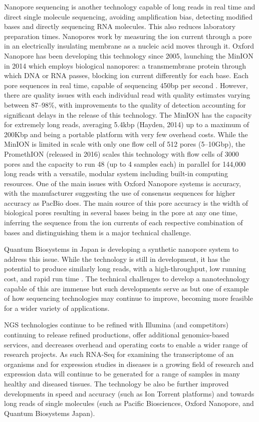 Nanopore sequencing is another technology capable of long reads in real time and direct single molecule sequencing, avoiding amplification bias, detecting modified bases and directly sequencing \gls{RNA} molecules. This also reduces laboratory preparation times. Nanopores work by measuring the ion current through a pore in an electrically insulating membrane as a nucleic acid moves through it. Oxford Nanopore has been developing this technology since 2005, launching the MinION in 2014 which employs biological nanopores: a transmembrane protein through which DNA or \gls{RNA} passes, blocking ion current differently for each base. Each pore sequences in real time, capable of sequencing 450bp per second \citep{nanoporetech}. However, there are quality issues with each individual read with quality estimates varying between 87--98\%, with improvements to the quality of detection accounting for significant delays in the release of this technology. The MinION has the capacity for extremely long reads, averaging 5.4kbp (Hayden, 2014) up to a maximum of 200Kbp and being a portable platform with very few overhead costs. While the MinION is limited in scale with only one flow cell of 512 pores (5--10Gbp), the PromethION (released in 2016) scales this technology with flow cells of 3000 pores and the capacity to run 48 (up to 4 samples each) in parallel for 144,000 long reads with a versatile, modular system including built-in computing resources. One of the main issues with Oxford Nanopore systems is accuracy, with the manufacturer suggesting the use of consensus sequences for higher accuracy as PacBio does. The main source of this pore accuracy is the width of biological pores resulting in several bases being in the pore at any one time, inferring the sequence from the ion currents of each respective combination of bases and distinguishing them is a major technical challenge.

Quantum Biosystems in Japan is developing a synthetic nanopore system to address this issue. While the technology is still in development, it has the potential to produce similarly long reads, with a high-throughput, low running cost, and rapid run time \citep{quantumbiosystems}. The technical challenges to develop a nanotechnology capable of this are immense but such developments serve as but one of example of how sequencing technologies may continue to improve, becoming more feasible for a wider variety of applications.

\fi

\Gls{NGS} technologies continue to be refined with Illumina (and competitors) continuing to release refined productions, offer additional genomics-based services, and decreases overhead and operating costs to enable a wider range of research projects. As such \gls{RNA-Seq} for examining the transcriptome of an organisms and for expression studies in diseases is a growing field of research and expression data will continue to be generated for a range of samples in many healthy and diseased tissues. The technology be also be further improved developments in speed and accuracy (such as Ion Torrent platforms) and towards long reads of single molecules (such as Pacific Biosciences, Oxford Nanopore, and Quantum Biosystems Japan).    

